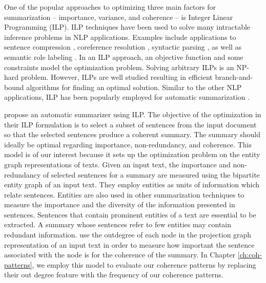 One of the popular approaches to optimizing three main factors for summarization -- importance, variance, and coherence -- is Integer Linear Programming (ILP). 
ILP techniques have been used to solve many intractable inference problems in NLP applications. 
Examples include applications to sentence compression \cite{clarke10,filippova13}, coreference resolution \cite{denis09},  syntactic parsing \cite{klenner07a}, as well as semantic role labeling \cite{punyakanok04b}. 
In an ILP approach, an objective function and some constraints model the optimization problem.  
Solving arbitrary ILPs is an \mbox{NP-hard} problem. 
However, ILPs are well studied resulting in efficient \mbox{branch-and-bound} algorithms for finding an optimal solution. 
Similar to the other NLP applications, ILP has been popularly employed for automatic summarization 
\cite{nishikawa10,galanis12,marciniak05b,mcdonald07,berg-kirkpatrick11,woodsend12,lichen13a,hirao13}.  

 propose an automatic summarizer using ILP.  
The objective of the optimization in their ILP formulation is to select a subset of sentences from the input document so that the selected sentences produce a coherent summary.
The summary should ideally be optimal regarding importance, non-redundancy, and coherence. 
This model is of our interest because it sets up the optimization problem on the entity graph representations of texts. 
Given an input text, the importance and non-redundancy of selected sentences for a summary are measured using the bipartite entity graph of an input text. 
They employ entities as units of information which relate sentences. 
Entities are also used in other summarization techniques to measure the importance and the diversity of the information presented in sentences.   
Sentences that contain prominent entities of a text are essential to be extracted. 
A summary whose sentences refer to few entities may contain redundant information. 
 use the outdegree of each node in the projection graph representation of an input text in order to measure how important the sentence associated with the node is for the coherence of the summary.  
In Chapter \ref{ch:coh-patterns}, we employ this model to evaluate our coherence patterns by replacing their out degree feature with the frequency of our coherence patterns. 



